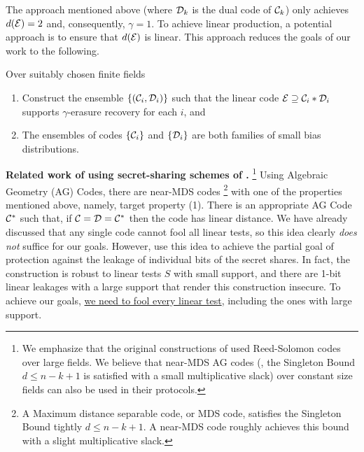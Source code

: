 
The approach mentioned above (where ${\mathcal D}_k$ is the dual code of ${\mathcal C}_k$) only achieves $d({\mathcal E})=2$ and, consequently, $\gamma=1$. 
To achieve linear production, a potential approach is to ensure that $d({\mathcal E})$ is linear.
%
This approach reduces the goals of our work to the following. 
\begin{boxedalgo}
	Over suitably chosen finite fields
	\begin{enumerate}
		\item Construct the ensemble $\{({\mathcal C}_i,{\mathcal D}_i)\}$ such that the linear code ${\mathcal E}\supseteq {\mathcal C}_i*{\mathcal D}_i$ supports $\gamma$-erasure recovery for each $i$, and 
		\item The ensembles of codes $\{{\mathcal C}_i\}$ and $\{{\mathcal D}_i\}$ are both families of small bias distributions. 
	\end{enumerate}
\end{boxedalgo} 




\noindent\textbf{Related work of \cite{TCC:MeiPrzWul07,ICALP:PrzWul08} using secret-sharing schemes of \cite{C:CheCra06}.}%
\footnote{
	We emphasize that the original constructions of \cite{TCC:MeiPrzWul07,ICALP:PrzWul08} used Reed-Solomon codes over large fields. 
	We believe that near-MDS AG codes (\ie, the Singleton Bound $d\leq n-k+1$ is satisfied with a small multiplicative slack) over constant size fields can also be used in their protocols.  
} 
Using Algebraic Geometry (AG) Codes, there are near-MDS codes%
\footnote{
	A Maximum distance separable code, or MDS code, satisfies the Singleton Bound tightly $d\leq n-k+1$. 
	A near-MDS code roughly achieves this bound with a slight multiplicative slack. 
}
with one of the properties mentioned above, namely, target property (1). 
There is an appropriate AG Code ${\mathcal C}^*$ such that, if ${\mathcal C}={\mathcal D}={\mathcal C}^*$ then the code \cE has linear distance. 
We have already discussed that any single code cannot fool all linear tests, so this idea clearly {\em does not} suffice for our goals. 
However, \cite{TCC:MeiPrzWul07,ICALP:PrzWul08} use this idea to achieve the partial goal of protection against the leakage of individual bits of the secret shares. 
In fact, the construction is robust to linear tests $S$ with small support, and there are 1-bit linear leakages with a large support that render this construction insecure. 
To achieve our goals, \underline{we need to fool every linear test}, including the ones with large support.  %
\\

